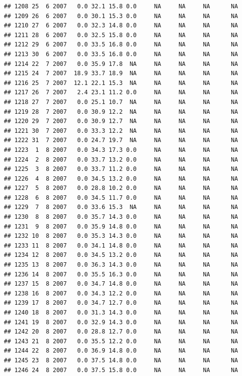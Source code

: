 \documentclass[
]{book}
\begin{document}
\begin{verbatim}
## 1208 25  6 2007   0.0 32.1 15.8 0.0     NA     NA     NA      NA
## 1209 26  6 2007   0.0 30.1 15.3 0.0     NA     NA     NA      NA
## 1210 27  6 2007   0.0 32.3 14.8 0.0     NA     NA     NA      NA
## 1211 28  6 2007   0.0 32.5 15.8 0.0     NA     NA     NA      NA
## 1212 29  6 2007   0.0 33.5 16.8 0.0     NA     NA     NA      NA
## 1213 30  6 2007   0.0 33.5 16.8 0.0     NA     NA     NA      NA
## 1214 22  7 2007   0.0 35.9 17.8  NA     NA     NA     NA      NA
## 1215 24  7 2007  18.9 33.7 18.9  NA     NA     NA     NA      NA
## 1216 25  7 2007  12.1 22.1 15.3  NA     NA     NA     NA      NA
## 1217 26  7 2007   2.4 23.1 11.2 0.0     NA     NA     NA      NA
## 1218 27  7 2007   0.0 25.1 10.7  NA     NA     NA     NA      NA
## 1219 28  7 2007   0.0 30.9 12.2  NA     NA     NA     NA      NA
## 1220 29  7 2007   0.0 30.9 12.7  NA     NA     NA     NA      NA
## 1221 30  7 2007   0.0 33.3 12.2  NA     NA     NA     NA      NA
## 1222 31  7 2007   0.0 24.7 19.7  NA     NA     NA     NA      NA
## 1223  1  8 2007   0.0 34.3 17.3 0.0     NA     NA     NA      NA
## 1224  2  8 2007   0.0 33.7 13.2 0.0     NA     NA     NA      NA
## 1225  3  8 2007   0.0 33.7 11.2 0.0     NA     NA     NA      NA
## 1226  4  8 2007   0.0 34.5 13.2 0.0     NA     NA     NA      NA
## 1227  5  8 2007   0.0 28.8 10.2 0.0     NA     NA     NA      NA
## 1228  6  8 2007   0.0 34.5 11.7 0.0     NA     NA     NA      NA
## 1229  7  8 2007   0.0 33.6 15.3  NA     NA     NA     NA      NA
## 1230  8  8 2007   0.0 35.7 14.3 0.0     NA     NA     NA      NA
## 1231  9  8 2007   0.0 35.9 14.8 0.0     NA     NA     NA      NA
## 1232 10  8 2007   0.0 35.3 14.3 0.0     NA     NA     NA      NA
## 1233 11  8 2007   0.0 34.1 14.8 0.0     NA     NA     NA      NA
## 1234 12  8 2007   0.0 34.5 13.2 0.0     NA     NA     NA      NA
## 1235 13  8 2007   0.0 36.3 14.3 0.0     NA     NA     NA      NA
## 1236 14  8 2007   0.0 35.5 16.3 0.0     NA     NA     NA      NA
## 1237 15  8 2007   0.0 34.7 14.8 0.0     NA     NA     NA      NA
## 1238 16  8 2007   0.0 34.3 12.2 0.0     NA     NA     NA      NA
## 1239 17  8 2007   0.0 34.7 12.7 0.0     NA     NA     NA      NA
## 1240 18  8 2007   0.0 31.3 14.3 0.0     NA     NA     NA      NA
## 1241 19  8 2007   0.0 32.9 14.3 0.0     NA     NA     NA      NA
## 1242 20  8 2007   0.0 28.8 12.7 0.0     NA     NA     NA      NA
## 1243 21  8 2007   0.0 35.5 12.2 0.0     NA     NA     NA      NA
## 1244 22  8 2007   0.0 36.9 14.8 0.0     NA     NA     NA      NA
## 1245 23  8 2007   0.0 37.5 14.8 0.0     NA     NA     NA      NA
## 1246 24  8 2007   0.0 37.5 15.8 0.0     NA     NA     NA      NA

\end{verbatim}
\end{document}
